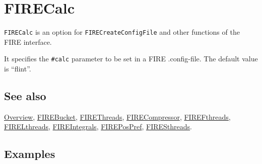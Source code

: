 \documentclass[../FeynHelpersManual.tex]{subfiles}
\begin{document}
\hypertarget{firecalc}{
\section{FIRECalc}\label{firecalc}}

\texttt{FIRECalc} is an option for \texttt{FIRECreateConfigFile} and
other functions of the FIRE interface.

It specifies the \texttt{\#{}\allowbreak{}calc} parameter to be set in a
FIRE .config-file. The default value is ``flint''.

\subsection{See also}

\hyperlink{toc}{Overview}, \hyperlink{firebucket}{FIREBucket},
\hyperlink{firethreads}{FIREThreads},
\hyperlink{firecompressor}{FIRECompressor},
\hyperlink{firefthreads}{FIREFthreads},
\hyperlink{firelthreads}{FIRELthreads},
\hyperlink{fireintegrals}{FIREIntegrals},
\hyperlink{firepospref}{FIREPosPref},
\hyperlink{firesthreads}{FIRESthreads}.

\subsection{Examples}
\end{document}
